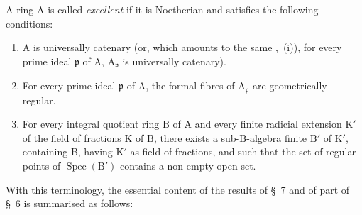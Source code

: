 \begin{definition}[7.8.2]
\label{IV.7.8.2}
A ring $\mathrm{A}$ is called \emph{excellent} if it is Noetherian and satisfies the following conditions:
\begin{enumerate}[label=(\roman*)]
  \item $\mathrm{A}$ is universally catenary (or, which amounts to the same ,~(i)), for every prime ideal $\mathfrak{p}$ of $\mathrm{A}$, $\mathrm{A}_\mathfrak{p}$ is universally catenary).
  \item For every prime ideal $\mathfrak{p}$ of $\mathrm{A}$, the formal fibres of $\mathrm{A}_\mathfrak{p}$ are geometrically regular.
  \item For every integral quotient ring $\mathrm{B}$ of $\mathrm{A}$ and every finite radicial extension $\mathrm{K}'$ of the field of fractions $\mathrm{K}$ of $\mathrm{B}$, there exists a sub-$\mathrm{B}$-algebra finite $\mathrm{B}'$ of $\mathrm{K}'$, containing $\mathrm{B}$, having $\mathrm{K}'$ as field of fractions, and such that the set of regular points of $\operatorname{Spec}(\mathrm{B}')$ contains a non-empty open set.
\end{enumerate}
With this terminology, the essential content of the results of \S~7 and of part of \S~6 is summarised as follows:
\end{definition}

